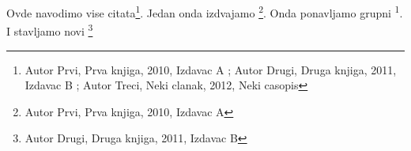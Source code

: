 \documentclass{article}
\begin{document}
Ovde navodimo vise citata\footnote{Autor Prvi, Prva knjiga, 2010, Izdavac A ; Autor Drugi, Druga knjiga, 2011, Izdavac B ; Autor Treci, Neki clanak, 2012, Neki casopis}. 
Jedan onda izdvajamo \footnote{Autor Prvi, Prva knjiga, 2010, Izdavac A}.
Onda ponavljamo grupni \textsuperscript{1}.
I stavljamo novi \footnote{Autor Drugi, Druga knjiga, 2011, Izdavac B}
\end{document}
